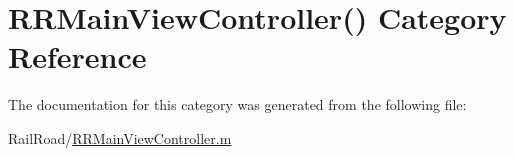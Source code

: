 \hypertarget{category_r_r_main_view_controller_07_08}{\section{R\-R\-Main\-View\-Controller() Category Reference}
\label{category_r_r_main_view_controller_07_08}
}


The documentation for this category was generated from the following file\-:\begin{DoxyCompactItemize}
\item 
Rail\-Road/\hyperlink{_r_r_main_view_controller_8m}{R\-R\-Main\-View\-Controller.\-m}\end{DoxyCompactItemize}

